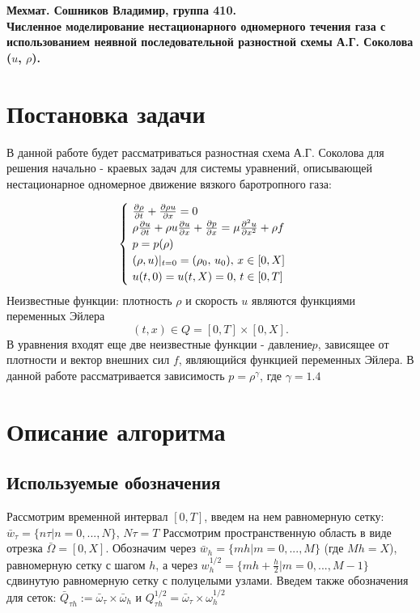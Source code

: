 \documentclass[12pt]{article}
\begin{document}
\begin{center} \large \bf
Мехмат. Сошников Владимир, группа 410.\\
Численное моделирование нестационарного одномерного течения газа с использованием неявной последовательной разностной схемы А.Г. Соколова   ($u$, $\rho$). 


\section{Постановка задачи}

В данной работе будет рассматриваться разностная схема А.Г. Соколова для решения начально - краевых задач для системы уравнений, описывающей нестационарное одномерное движение вязкого баротропного газа:

\begin{equation*}
 \begin{cases}
   \text
     {
       $
         \frac {\partial \rho} {\partial t} + 
         \frac {\partial \rho u} {\partial x} = 
         0
       $
     }
   \\
   \text 
     {
       $
          \rho \frac {\partial u} {\partial t} +
          \rho u \frac {\partial u} {\partial x} + 
          \frac {\partial p} {\partial x} =
          \mu \frac {\partial^{2} u} {\partial x ^{2}} +
          \rho f
       $
     }
   \\
   \text 
     {
       $
         p = p (\rho)
       $
     } 
   \\
   \text 
     {
       $
        (\rho, u)|_{t = 0} = (\rho_{0}, \,u_{0}), \,  x \in [0, X]
       $
     } 
   \\
   \text 
     {
       $
        u (t, 0) = u (t, X) = 0, \,t \in [0, T]
       $
     } 
 \end{cases}
\end{equation*}
Неизвестные функции: плотность $\rho$ и скорость $u$ являются функциями переменных Эйлера
$$
(t,x) \in Q = [0,T] \times [0,X].
$$
В уравнения входят еще две неизвестные функции - давление$p$, зависящее от плотности и вектор внешних сил $f$, являющийся функцией переменных Эйлера.
В данной работе рассматривается зависимость $p = \rho ^{\gamma}$, где $\gamma = 1.4$
\section{Описание алгоритма}
\subsection{Используемые обозначения}
Рассмотрим временной интервал $[0,T]$, введем на нем равномерную сетку:
$ \bar w_{\tau} = \{n \tau | n = 0,...,N\}$, $N \tau = T$
Рассмотрим пространственную область в виде отрезка $\bar \Omega = [0, X]$. Обозначим  через $\bar w_{h} = \{mh|m = 0,...,M\}$ (где $Mh = X$), равномерную сетку с шагом $h$, а
через $w_{h}^{1/2} = \{mh + \frac{h}{2} | m = 0,..., M - 1\}$ сдвинутую равномерную сетку с полуцелыми узлами.
Введем также обозначения для сеток:
$
\bar Q_{\tau h} := \bar \omega_{\tau} \times \bar \omega_{h}
$
и 
$
Q_{\tau h}^{1/2} = \bar \omega_{\tau} \times \omega_{h}^{1/2}
$



\end{center}
\end{document}
